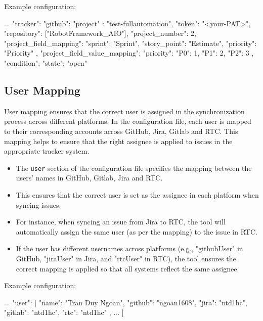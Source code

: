 Example configuration:
\begin{pythoncode}
{
   ...
   "tracker": {
      "github": {
         "project" : "test-fullautomation",
         "token": "<your-PAT>",
         "repository": ["RobotFramework_AIO"],
         "project_number": 2,
         "project_field_mapping": {
            "sprint":      "Sprint",
            "story_point": "Estimate",
            "priority":    "Priority"
         },
         "project_field_value_mapping": {
            "priority": { "P0": 1, "P1": 2, "P2": 3 }
         },
         "condition": { "state": "open" }
      }
   }
}
\end{pythoncode}

\subsection{User Mapping}
User mapping ensures that the correct user is assigned in the synchronization
process across different platforms.
In the configuration file, each user is mapped to their corresponding accounts
across GitHub, Jira, Gitlab and RTC. This mapping helps to ensure that the right
assignee is applied to issues in the appropriate tracker system.

\begin{itemize}
   \item The \texttt{user} section of the configuration file specifies the
         mapping between the users' names in GitHub, Gitlab, Jira and RTC.
   \item This ensures that the correct user is set as the assignee in each
         platform when syncing issues.
   \item For instance, when syncing an issue from Jira to RTC, the tool will
         automatically assign the same user (as per the mapping) to the issue in RTC.
   \item If the user has different usernames across platforms
         (e.g., "githubUser" in GitHub, "jiraUser" in Jira, and "rtcUser" in RTC),
         the tool ensures the correct mapping is applied so that all systems
         reflect the same assignee.
\end{itemize}

Example configuration:
\begin{pythoncode}
{
   ...
   "user": [
      {
         "name": "Tran Duy Ngoan",
         "github": "ngoan1608",
         "jira": "ntd1hc",
         "gitlab": "ntd1hc",
         "rtc": "ntd1hc"
      },
      ...
   ]
}
\end{pythoncode}

